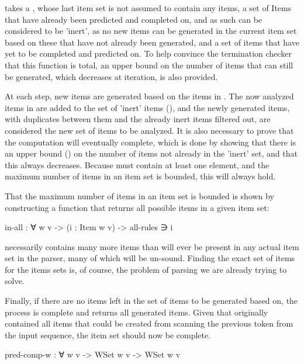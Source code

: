 		 takes a , whose last item set is not
		assumed to contain any items, a set of Items that have already been
		predicted and completed on, and as such can be considered to be
		'inert', as no new items can be generated in the current item set based
		on these that have not already been generated, and a set of items that
		have yet to be completed and predicted on. To help convince the
		termination checker that this function is total, an upper bound on the
		number of items that can still be generated, which decreases at
		iteration, is also provided.

		At each step, new items are generated based on the items in
		. The now analyzed items in  are added to the set
		of 'inert' items (), and the newly generated items, with
		duplicates between them and the already inert items filtered out, are
		considered the new set of items to be analyzed. It is also necessary to
		prove that the computation will eventually complete, which is done by
		showing that there is an upper bound () on the number of items not already in the
		'inert' set, and that this always decreases. Because  must
		contain at least one element, and the maximum number of items in an
		item set is bounded, this will always hold.

		That the maximum number of items in an item set is bounded is shown by
		constructing a function that returns all possible items in a given item
		set:

		\begin{code}
			in-all : ∀ {w v} -> (i : Item w v) -> all-rules ∋ i
		\end{code}

		 necessarily contains many more items than will ever
		be present in any actual item set in the parser, many of which will be
		un-sound. Finding the exact set of items for the items sets is, of
		course, the problem of parsing we are already trying to solve.

		Finally, if there are no items left in the set of items to be generated
		based on, the process is complete and  returns all
		generated items. Given that  originally contained all items
		that could be created from scanning the previous token from the input
		sequence, the item set should now be complete.

		\begin{code}
			pred-comp-w : ∀ {w v} -> WSet w v -> WSet w v
		\end{code}

